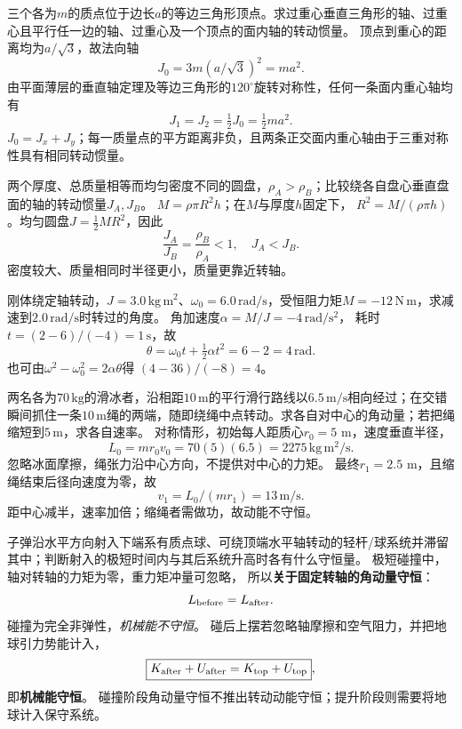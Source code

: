 \problemtext 三个各为$m$的质点位于边长$a$的等边三角形顶点。求过重心垂直三角形的轴、过重心且平行任一边的轴、过重心及一个顶点的面内轴的转动惯量。
\workings
顶点到重心的距离均为$a/\sqrt3$，故法向轴
\[
\boxed{J_0=3m(a/\sqrt3)^2=ma^2}.
\]
由平面薄层的垂直轴定理及等边三角形的$120^\circ$旋转对称性，任何一条面内重心轴均有
\[
\boxed{J_1=J_2=\tfrac12J_0=\tfrac12ma^2}.
\]
\crosscheck $J_0=J_x+J_y$；每一质量点的平方距离非负，且两条正交面内重心轴由于三重对称性具有相同转动惯量。

\problemtext 两个厚度、总质量相等而均匀密度不同的圆盘，$\rho_A>\rho_B$；比较绕各自盘心垂直盘面的轴的转动惯量$J_A,J_B$。
\workings
$M=\rho\pi R^2h$；在$M$与厚度$h$固定下，
$R^2=M/(\rho\pi h)$。均匀圆盘$J=\frac12MR^2$，因此
\[
\frac{J_A}{J_B}=\frac{\rho_B}{\rho_A}<1,
\quad \boxed{J_A<J_B}.
\]
\crosscheck 密度较大、质量相同时半径更小，质量更靠近转轴。

\problemtext 刚体绕定轴转动，$J=3.0\,\mathrm{kg\,m^2}$、$\omega_0=6.0\,\mathrm{rad/s}$，受恒阻力矩$M=-12\,\mathrm{N\,m}$，求减速到$2.0\,\mathrm{rad/s}$时转过的角度。
\workings
角加速度$\alpha=M/J=-4\,\mathrm{rad/s^2}$，
耗时$t=(2-6)/(-4)=1\,\mathrm s$，故
\[
\boxed{\theta=\omega_0t+\tfrac12\alpha t^2
=6-2=4\,\mathrm{rad}}.
\]
\crosscheck 也可由$\omega^2-\omega_0^2=2\alpha\theta$得
$(4-36)/(-8)=4$。

\problemtext 两名各为$70\,\mathrm{kg}$的滑冰者，沿相距$10\,\mathrm m$的平行滑行路线以$6.5\,\mathrm{m/s}$相向经过；在交错瞬间抓住一条$10\,\mathrm m$绳的两端，随即绕绳中点转动。求各自对中心的角动量；若把绳缩短到$5\,\mathrm m$，求各自速率。
\workings
对称情形，初始每人距质心$r_0=5$ m，速度垂直半径，
\[
\boxed{L_0=mr_0v_0=70(5)(6.5)=2275\,\mathrm{kg\,m^2/s}}.
\]
忽略冰面摩擦，绳张力沿中心方向，不提供对中心的力矩。
最终$r_1=2.5$ m，且缩绳结束后径向速度为零，故
\[
\boxed{v_1=L_0/(mr_1)=13\,\mathrm{m/s}}.
\]
\crosscheck 距中心减半，速率加倍；缩绳者需做功，故动能不守恒。

\problemtext 子弹沿水平方向射入下端系有质点球、可绕顶端水平轴转动的轻杆/球系统并滞留其中；判断射入的极短时间内与其后系统升高时各有什么守恒量。
\workings
极短碰撞中，轴对转轴的力矩为零，重力矩冲量可忽略，
所以\textbf{关于固定转轴的角动量守恒}：
\[
L_{\rm before}=L_{\rm after}.
\]
碰撞为完全非弹性，\emph{机械能不守恒}。
碰后上摆若忽略轴摩擦和空气阻力，并把地球引力势能计入，
\[
\boxed{K_{\rm after}+U_{\rm after}=K_{\rm top}+U_{\rm top}},
\]
即\textbf{机械能守恒}。
\crosscheck 碰撞阶段角动量守恒不推出转动动能守恒；提升阶段则需要将地球计入保守系统。

